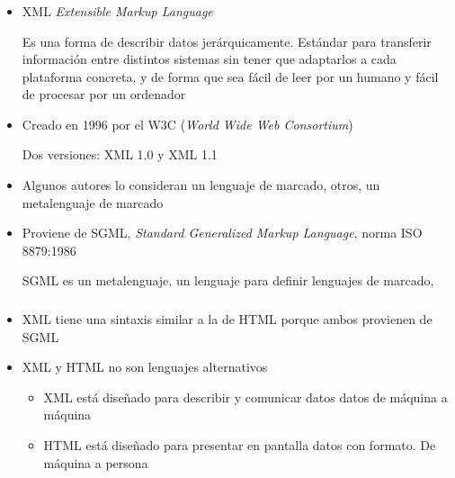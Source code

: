\documentclass[ucs]{beamer}
\begin{document}
\begin{frame}[fragile]
\frametitle{}
\begin{itemize}
\item
XML \emph{Extensible Markup Language}

Es una forma de describir datos jerárquicamente.
Estándar para transferir información entre distintos sistemas sin tener
que adaptarlos a cada plataforma concreta, y de forma que sea fácil
de leer por un humano y fácil de procesar por un ordenador

\item
Creado en 1996 por el W3C (\emph{World Wide Web Consortium})

Dos versiones: XML 1.0 y XML 1.1
\item
Algunos autores lo consideran un lenguaje de marcado, otros, un metalenguaje
de marcado
\item
Proviene de
SGML, \emph{Standard Generalized Markup Language}, norma ISO 8879:1986


SGML es un metalenguaje, un lenguaje para definir lenguajes de marcado,
\end{itemize}
\end{frame}




\begin{frame}[fragile]
\frametitle{}
\begin{itemize}
\item
XML tiene una sintaxis similar a la de HTML porque ambos provienen de SGML
\item
XML y HTML no son lenguajes alternativos

\begin{itemize}
\item
XML está diseñado para describir y comunicar datos datos de máquina a máquina
\item
HTML está diseñado para presentar en pantalla datos con formato. De máquina a persona 
\end{itemize}

\end{itemize}

\end{frame}
\end{document}
